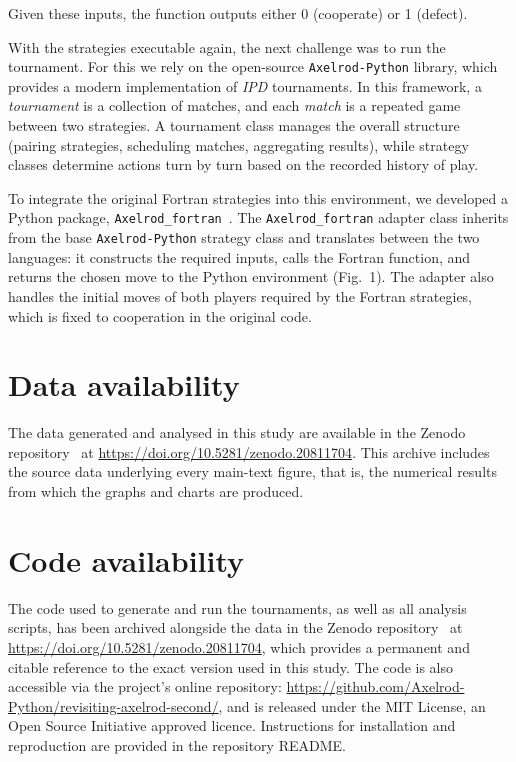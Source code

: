 \documentclass{article}
\newcommand{\IPD}{\emph{IPD}}
\newcommand{\AXL}{\texttt{Axelrod-Python}}
\newcommand{\AXLFortran}{\texttt{Axelrod\_fortran}}
\begin{document}
Given these inputs, the function outputs either 0 (cooperate) or 1 (defect).

With the strategies executable again, the next challenge was to run the
tournament. For this we rely on the open-source \AXL{} library, which provides a
modern implementation of \IPD{} tournaments. In this framework, a
\emph{tournament} is a collection of matches, and each \emph{match} is a
repeated game between two strategies. A tournament class manages the overall
structure (pairing strategies, scheduling matches, aggregating results), while
strategy classes determine actions turn by turn based on the recorded history of
play.

To integrate the original Fortran strategies into this environment, we developed
a Python package, \AXLFortran~\cite{Axelrod_fortran}. The \AXLFortran{} adapter
class inherits from the base \AXL{} strategy class and translates between the two
languages: it constructs the required inputs, calls the Fortran function, and
returns the chosen move to the Python environment
(Fig.~1). The adapter also handles the initial moves
of both players
required by the Fortran strategies, which is fixed to cooperation in the original
code.

\section*{Data availability}
The data generated and analysed in this study are available in the Zenodo
repository~\cite{knight_2025_20811704} at
\url{https://doi.org/10.5281/zenodo.20811704}. This archive includes the source
data underlying every main-text figure, that is, the numerical results from which
the graphs and charts are produced.

\section*{Code availability}
The code used to generate and run the tournaments, as well as all analysis
scripts, has been archived alongside the data in the Zenodo
repository~\cite{knight_2025_20811704} at
\url{https://doi.org/10.5281/zenodo.20811704}, which provides a permanent and
citable reference to the exact version used in this study. The code is also
accessible via the project's online repository:
\url{https://github.com/Axelrod-Python/revisiting-axelrod-second/}, and is
released under the MIT License, an Open Source Initiative approved licence.
Instructions for installation and reproduction are provided in the repository
README.
\end{document}
